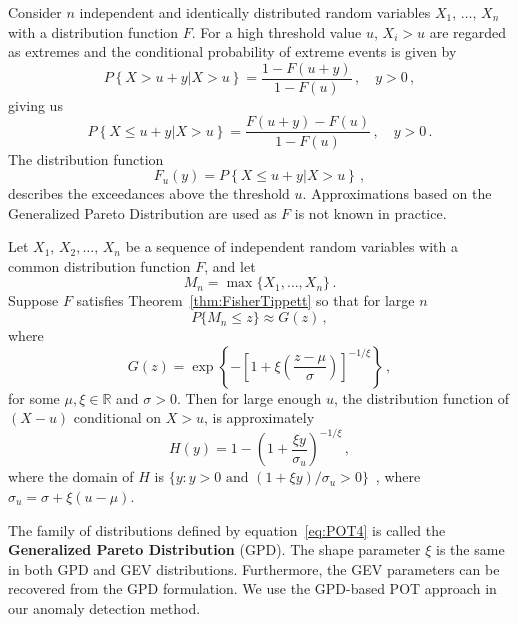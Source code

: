 Consider $n$ independent and identically distributed random variables $X_1, \, \ldots, \, X_n$ with a distribution function $F$.  For a high threshold value $u$,  $X_i > u$ are regarded as extremes and the conditional probability of extreme events is given by  
\begin{equation}\label{eq:POT1}
    P\left \{X > u + y | X > u \right \} = \frac{1 - F(u+y)}{1 - F(u)}\, , \quad y >0 \, , 
\end{equation}
giving us
\begin{equation}\label{eq:POT2}
    P\left \{X \leq u + y | X > u \right \} = \frac{ F(u+y) - F(u)}{1 - F(u)}\, , \quad y >0 \, . 
\end{equation}
The distribution function
\begin{equation}\label{eq:POT3}
    F_u(y) = P\left \{X \leq u + y | X > u \right \}\, , 
\end{equation}
describes the exceedances above the threshold $u$. %
Approximations based on the Generalized Pareto Distribution \citep{Pickands1975} are used as $F$ is not known in practice. 
\begin{theorem}[Pickands] Let $X_1, \, X_2, \ldots, \, X_n$  be a sequence of independent random variables with a common distribution function $F$, and let
$$ M_n = \max \{X_1, \ldots, X_n \} \, .
$$
Suppose $F$ satisfies Theorem~\ref{thm:FisherTippett} so that for large $n$
$$ P\{ M_n \leq z \} \approx G(z)\, , 
$$
where 
$$  G(z) = \exp\left\{ -\left[ 1 + \xi\left(\frac{z - \mu}{\sigma} \right)\right]^{-1/\xi} \right\}\, , 
$$
for some $\mu, \xi \in \mathbb{R}$ and $\sigma >0$. Then for large enough $u$, the distribution function of $(X-u)$ conditional on $X > u$, is approximately
\begin{equation}\label{eq:POT4}
    H(y) = 1 - \left( 1 + \frac{\xi y}{\sigma_u} \right)^{-1/\xi}\, , 
\end{equation}
where the domain of $H$ is $\{y: y >0\, \,    \text{and} \, \,  (1 + \xi y)/\sigma_u >0  \}$\, , where $\sigma_u = \sigma + \xi(u- \mu)$. 
\end{theorem}
The family of distributions defined by equation~\eqref{eq:POT4} is called the \textbf{Generalized Pareto Distribution} (GPD). 
The shape parameter $\xi$ is the same in both GPD and GEV distributions. Furthermore, the GEV parameters can be recovered from the GPD formulation. We use the GPD-based POT approach in our anomaly detection method. 

